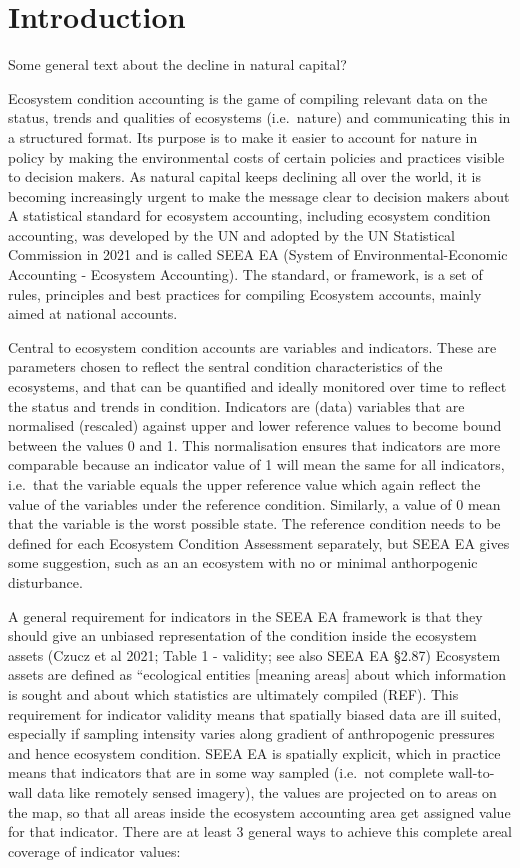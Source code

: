 \documentclass[
  super,
  preprint,
  3p]{elsarticle}
\begin{document}
\hypertarget{introduction}{%
\section{Introduction}\label{introduction}}

Some general text about the decline in natural capital?

Ecosystem condition accounting is the game of compiling relevant data on
the status, trends and qualities of ecosystems (i.e.~nature) and
communicating this in a structured format. Its purpose is to make it
easier to account for nature in policy by making the environmental costs
of certain policies and practices visible to decision makers. As natural
capital keeps declining all over the world, it is becoming increasingly
urgent to make the message clear to decision makers about A statistical
standard for ecosystem accounting, including ecosystem condition
accounting, was developed by the UN and adopted by the UN Statistical
Commission in 2021 and is called SEEA EA (System of
Environmental-Economic Accounting - Ecosystem Accounting). The standard,
or framework, is a set of rules, principles and best practices for
compiling Ecosystem accounts, mainly aimed at national accounts.

Central to ecosystem condition accounts are variables and indicators.
These are parameters chosen to reflect the sentral condition
characteristics of the ecosystems, and that can be quantified and
ideally monitored over time to reflect the status and trends in
condition. Indicators are (data) variables that are normalised
(rescaled) against upper and lower reference values to become bound
between the values 0 and 1. This normalisation ensures that indicators
are more comparable because an indicator value of 1 will mean the same
for all indicators, i.e.~that the variable equals the upper reference
value which again reflect the value of the variables under the reference
condition. Similarly, a value of 0 mean that the variable is the worst
possible state. The reference condition needs to be defined for each
Ecosystem Condition Assessment separately, but SEEA EA gives some
suggestion, such as an an ecosystem with no or minimal anthorpogenic
disturbance.

A general requirement for indicators in the SEEA EA framework is that
they should give an unbiased representation of the condition inside the
ecosystem assets (Czucz et al 2021; Table 1 - validity; see also SEEA EA
§2.87) Ecosystem assets are defined as ``ecological entities {[}meaning
areas{]} about which information is sought and about which statistics
are ultimately compiled (REF). This requirement for indicator validity
means that spatially biased data are ill suited, especially if sampling
intensity varies along gradient of anthropogenic pressures and hence
ecosystem condition. SEEA EA is spatially explicit, which in practice
means that indicators that are in some way sampled (i.e.~not complete
wall-to-wall data like remotely sensed imagery), the values are
projected on to areas on the map, so that all areas inside the ecosystem
accounting area get assigned value for that indicator. There are at
least 3 general ways to achieve this complete areal coverage of
indicator values:
\end{document}
